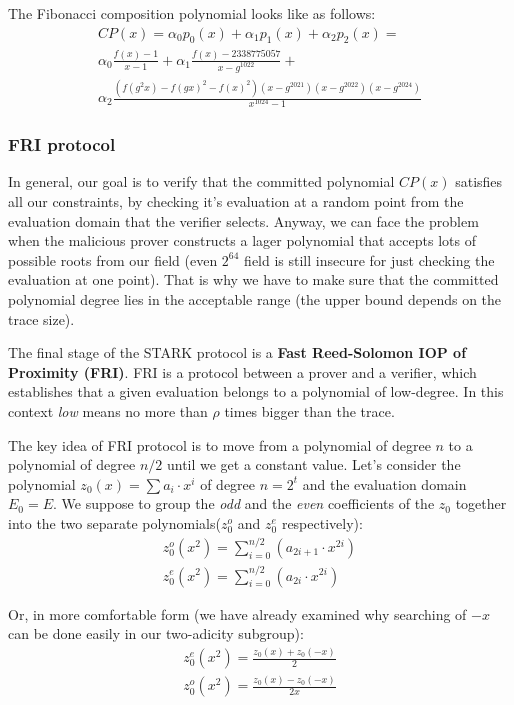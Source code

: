 \documentclass[../lecture-notes.tex]{subfiles}
\begin{document}
\begin{example}
The Fibonacci composition polynomial looks like as follows:
\begin{gather*}
    CP(x) = \alpha_0 p_0(x) + \alpha_1 p_1(x) + \alpha_2 p_2(x) =\\
    \alpha_0 \frac{f(x)-1}{x - 1} + \alpha_1 \frac{f(x) - 2338775057}{x - g^{1022}} + \\
    \alpha_2 \frac{(f(g^2x) - f(gx)^2 - f(x)^2)(x - g^{2021})(x - g^{2022})(x - g^{2024})}{x^{1024} - 1}
\end{gather*}
\end{example}

\subsubsection{FRI protocol}
In general, our goal is to verify that the committed polynomial $CP(x)$ satisfies all our constraints, by checking it's evaluation at a random point from the evaluation domain that the verifier selects. Anyway, we can face the problem when the malicious prover constructs a lager polynomial that accepts lots of possible roots from our field (even $2^{64}$ field is still insecure for just checking the evaluation at one point). That is why we have to make sure that the committed polynomial degree lies in the acceptable range (the upper bound depends on the trace size).

The final stage of the STARK protocol is a \textbf{Fast Reed-Solomon IOP of Proximity (FRI)}. FRI is a protocol between a prover and a verifier, which establishes that a given evaluation belongs to a polynomial of low-degree. In this context \textit{low} means no more than $\rho$ times bigger than the trace.

The key idea of FRI protocol is to move from a polynomial of degree $n$ to a polynomial of degree $n/2$ until we get a constant value. Let's consider the polynomial $z_0(x) = \sum a_i\cdot x^i$ of degree $n=2^t$ and the evaluation domain $E_0 = E$. We suppose to group the \textit{odd} and the \textit{even} coefficients of the $z_0$ together into the two separate polynomials($z_0^o$ and $z_0^e$ respectively):
\begin{gather*}
    z_0^o(x^2) = \sum_{i=0}^{n/2} (a_{2i+1}\cdot x^{2i})\\
    z_0^e(x^2) = \sum_{i=0}^{n/2} (a_{2i}\cdot x^{2i})
\end{gather*}

Or, in more comfortable form (we have already examined why searching of $-x$ can be done easily in our two-adicity subgroup):
\begin{gather*}
    z_0^e(x^2) = \frac{z_0(x) + z_0(-x)}{2}\\
    z_0^o(x^2) = \frac{z_0(x) - z_0(-x)}{2x}
\end{gather*}
\end{document}
